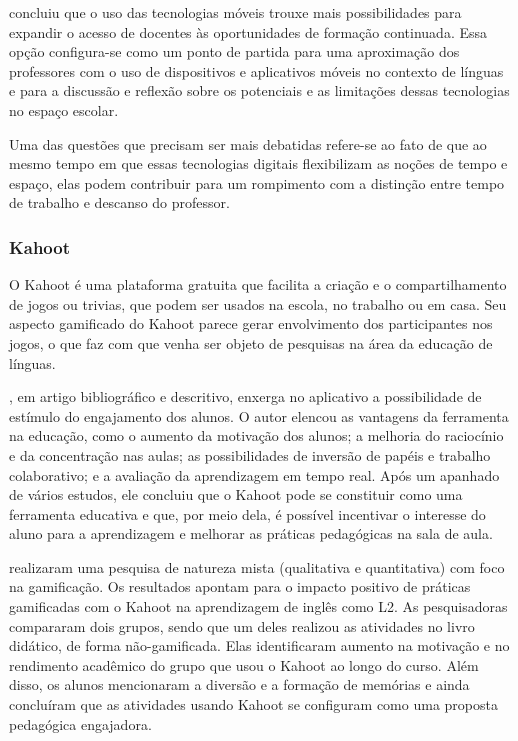 \documentclass[portuguese]{textolivre}
\begin{document}
\textcite{teixeira_formacao_2018} concluiu que o uso das tecnologias móveis trouxe mais possibilidades para expandir o acesso de docentes às oportunidades de formação continuada. Essa opção configura-se como um ponto de partida para uma aproximação dos professores com o uso de dispositivos e aplicativos móveis no contexto de línguas e para a discussão e reflexão sobre os potenciais e as limitações dessas tecnologias no espaço escolar.

Uma das questões que precisam ser mais debatidas refere-se ao fato de que ao mesmo tempo em que essas tecnologias digitais flexibilizam as noções de tempo e espaço, elas podem contribuir para um rompimento com a distinção entre tempo de trabalho e descanso do professor.

\subsubsection{Kahoot}\label{sec-idioma}
O Kahoot é uma plataforma gratuita que facilita a criação e o compartilhamento de jogos ou trivias, que podem ser usados na escola, no trabalho ou em casa. Seu aspecto gamificado do Kahoot parece gerar envolvimento dos participantes nos jogos, o que faz com que venha ser objeto de pesquisas na área da educação de línguas.

\textcite{bottentuit_junior_o_2017}, em artigo bibliográfico e descritivo, enxerga no aplicativo a possibilidade de estímulo do engajamento dos alunos.  O autor elencou as vantagens da ferramenta na educação, como o aumento da motivação dos alunos; a melhoria do raciocínio e da concentração nas aulas; as possibilidades de inversão de papéis e trabalho colaborativo; e a avaliação da aprendizagem em tempo real. Após um apanhado de vários estudos, ele concluiu que o Kahoot pode se constituir como uma ferramenta educativa e que, por meio dela, é possível incentivar o interesse do aluno para a aprendizagem e melhorar as práticas pedagógicas na sala de aula.

\textcite{weissheimer_aplicativos_2017} realizaram uma pesquisa de natureza mista (qualitativa e quantitativa) com foco na gamificação. Os resultados apontam para o impacto positivo de práticas gamificadas com o Kahoot na aprendizagem de inglês como L2. As pesquisadoras compararam dois grupos, sendo que um deles realizou as atividades no livro didático, de forma não-gamificada. Elas identificaram aumento na motivação e no rendimento acadêmico do grupo que usou o Kahoot ao longo do curso. Além disso, os alunos mencionaram a diversão e a formação de memórias e ainda concluíram que as atividades usando Kahoot se configuram como uma proposta pedagógica engajadora.
\end{document}
